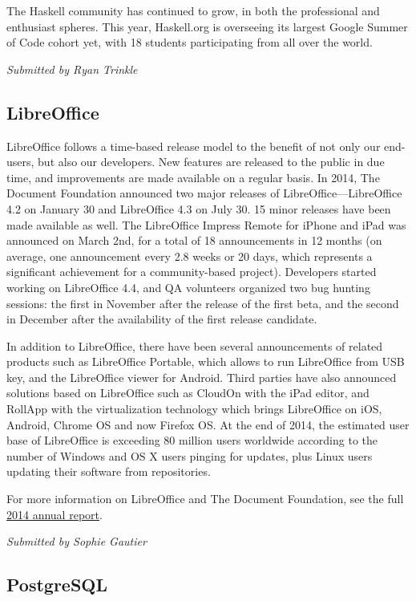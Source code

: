 \documentclass[letterpaper]{report}
\begin{document}
The Haskell community has continued to grow, in both the professional and
enthusiast spheres.  This year, Haskell.org is overseeing its largest
Google Summer of Code cohort yet, with 18 students participating from all
over the world.

{\em Submitted by Ryan Trinkle}

\subsection{LibreOffice}

LibreOffice follows a time-based release model to the benefit of not only
our end-users, but also our developers. New features are released to the
public in due time, and improvements are made available on a regular basis.
In 2014, The Document Foundation announced two major releases of
LibreOffice---LibreOffice 4.2 on January 30 and LibreOffice 4.3 on July 30.
15 minor releases have been made available as well. The LibreOffice Impress
Remote for iPhone and iPad was announced on March 2nd, for a total of 18
announcements in 12 months (on average, one announcement every 2.8 weeks or
20 days, which represents a significant achievement for a community-based
project). Developers started working on LibreOffice 4.4, and QA volunteers
organized two bug hunting sessions: the first in November after the release
of the first beta, and the second in December after the availability of the
first release candidate.

In addition to LibreOffice, there have been several announcements of
related products such as LibreOffice Portable, which allows to run
LibreOffice from USB key, and the LibreOffice viewer for Android. Third
parties have also announced solutions based on LibreOffice such as CloudOn
with the iPad editor, and RollApp with the virtualization technology which
brings LibreOffice on iOS, Android, Chrome OS and now Firefox OS. At the
end of 2014, the estimated user base of LibreOffice is exceeding 80 million
users worldwide according to the number of Windows and OS X users pinging
for updates, plus Linux users updating their software from repositories.

For more information on LibreOffice and The Document Foundation, see the
full
\href{https://wiki.documentfoundation.org/File:TDF2014AnnualReport.pdf}{2014
annual report}.

{\em Submitted by Sophie Gautier}

\subsection{PostgreSQL}
\end{document}
